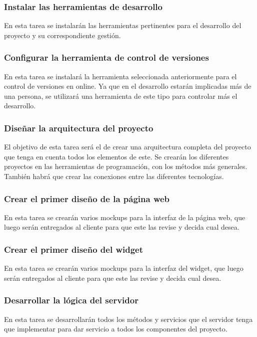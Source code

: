 \subsubsection{Instalar las herramientas de desarrollo}
En esta tarea se instalarán las herramientas pertinentes para el desarrollo del proyecto y su correspondiente gestión.

\subsubsection{Configurar la herramienta de control de versiones}
En esta tarea se instalará la herramienta seleccionada anteriormente para el control de versiones en online. Ya que en el desarrollo estarán implicadas más de una persona, se utilizará una herramienta de este tipo para controlar más el desarrollo.

\subsubsection{Diseñar la arquitectura del proyecto}
El objetivo de esta tarea será el de crear una arquitectura completa del proyecto que tenga en cuenta todos los elementos de este. Se crearán los diferentes proyectos en las herramientas de programación, con los métodos más generales. También habrá que crear las conexiones entre las diferentes tecnologías.

\subsubsection{Crear el primer diseño de la página web}
En esta tarea se crearán varios mockups para la interfaz de la página web, que luego serán entregados al cliente para que este las revise y decida cual desea.

\subsubsection{Crear el primer diseño del widget}
En esta tarea se crearán varios mockups para la interfaz del widget, que luego serán entregados al cliente para que este las revise y decida cual desea.

\subsubsection{Desarrollar la lógica del servidor}
En esta tarea se desarrollarán todos los métodos y servicios que el servidor tenga que implementar para dar servicio a todos los componentes del proyecto.

